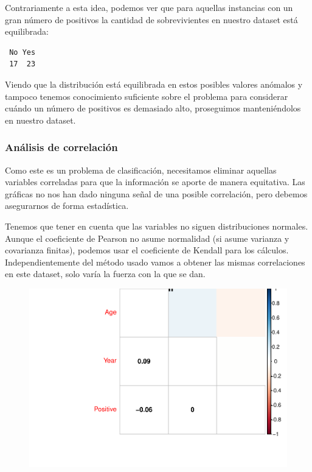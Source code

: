 Contrariamente a esta idea, podemos ver que para aquellas instancias con un gran número de positivos la cantidad de sobrevivientes en nuestro dataset está equilibrada:

\begin{verbatim}
 No Yes 
 17  23 
\end{verbatim}

Viendo que la distribución está equilibrada en estos posibles valores anómalos y tampoco tenemos conocimiento suficiente sobre el problema para considerar cuándo un número de positivos es demasiado alto, proseguimos manteniéndolos en nuestro dataset.

\subsubsection{Análisis de correlación}

Como este es un problema de clasificación, necesitamos eliminar aquellas variables correladas para que la información se aporte de manera equitativa. Las gráficas no nos han dado ninguna señal de una posible correlación, pero debemos asegurarnos de forma estadística.

\vspace{\baselineskip}

Tenemos que tener en cuenta que las variables no siguen distribuciones normales. Aunque el coeficiente de Pearson no asume normalidad (si asume varianza y covarianza finitas), podemos usar el coeficiente de Kendall para los cálculos. Independientemente del método usado vamos a obtener las mismas correlaciones en este dataset, solo varía la fuerza con la que se dan.

\begin{figure}[H]\includegraphics[width=.9\linewidth]{img/EDA2_files/figure-latex/unnamed-chunk-27-1} \end{figure}

